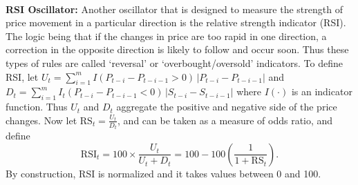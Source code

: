\noindent{} \\[0.2cm]


\noindent\textbf{RSI Oscillator:} Another oscillator that is designed to measure the strength of price movement in a particular direction is the relative strength indicator (RSI). The logic being that if the changes in price are too rapid in one direction, a correction in the opposite direction is likely to follow and occur soon. Thus these types of rules are called `reversal' or `overbought/oversold' indicators. To define RSI, let $U_{t} = \sum_{i=1}^m I(P_{t-i} - P_{t-i-1} > 0)\,\lvert P_{t-i} - P_{t-i-1} \rvert$ and $D_{t} = \sum_{i=1}^m I_{t} (P_{t-i} - P_{t-i-1} < 0)\,\lvert S_{t-i} - S_{t-i-1}\rvert$ where $I(\cdot)$ is an indicator function. Thus $U_t$ and $D_t$ aggregate the positive and negative side of the price changes. Now let $\text{RS}_{t} = \frac {U_{t}}{D_{t}}$, and can be taken as a measure of odds ratio, and define
	\begin{equation} \label{eqn:rsi}
	\text{RSI}_{t} = 100 \times \frac{U_{t}}{U_{t} + D_{t}} = 100 - 100 \left( \dfrac{1}{1 + \text{RS}_t} \right).
	\end{equation}
By construction, RSI is normalized and it takes values between 0 and 100. \\


\noindent{} \\


